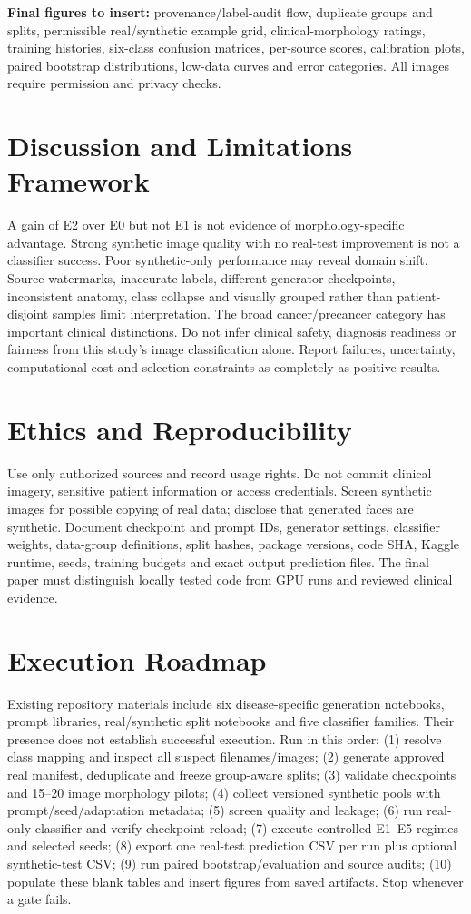 \documentclass[11pt,a4paper]{article}
\begin{document}
\textbf{Final figures to insert:} provenance/label-audit flow, duplicate groups and splits, permissible real/synthetic example grid, clinical-morphology ratings, training histories, six-class confusion matrices, per-source scores, calibration plots, paired bootstrap distributions, low-data curves and error categories. All images require permission and privacy checks.

\section{Discussion and Limitations Framework}
A gain of E2 over E0 but not E1 is not evidence of morphology-specific advantage. Strong synthetic image quality with no real-test improvement is not a classifier success. Poor synthetic-only performance may reveal domain shift. Source watermarks, inaccurate labels, different generator checkpoints, inconsistent anatomy, class collapse and visually grouped rather than patient-disjoint samples limit interpretation. The broad cancer/precancer category has important clinical distinctions. Do not infer clinical safety, diagnosis readiness or fairness from this study's image classification alone. Report failures, uncertainty, computational cost and selection constraints as completely as positive results.

\section{Ethics and Reproducibility}
Use only authorized sources and record usage rights. Do not commit clinical imagery, sensitive patient information or access credentials. Screen synthetic images for possible copying of real data; disclose that generated faces are synthetic. Document checkpoint and prompt IDs, generator settings, classifier weights, data-group definitions, split hashes, package versions, code SHA, Kaggle runtime, seeds, training budgets and exact output prediction files. The final paper must distinguish locally tested code from GPU runs and reviewed clinical evidence.

\section{Execution Roadmap}
Existing repository materials include six disease-specific generation notebooks, prompt libraries, real/synthetic split notebooks and five classifier families. Their presence does not establish successful execution. Run in this order: (1) resolve class mapping and inspect all suspect filenames/images; (2) generate approved real manifest, deduplicate and freeze group-aware splits; (3) validate checkpoints and 15--20 image morphology pilots; (4) collect versioned synthetic pools with prompt/seed/adaptation metadata; (5) screen quality and leakage; (6) run real-only classifier and verify checkpoint reload; (7) execute controlled E1--E5 regimes and selected seeds; (8) export one real-test prediction CSV per run plus optional synthetic-test CSV; (9) run paired bootstrap/evaluation and source audits; (10) populate these blank tables and insert figures from saved artifacts. Stop whenever a gate fails.
\end{document}
